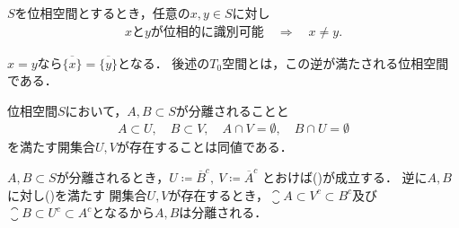 	\begin{screen}
		\begin{thm}[位相的に識別可能な二点は相異なる]
			$S$を位相空間とするとき，任意の$x,y \in S$に対し
			\begin{align}
				\mbox{$x$と$y$が位相的に識別可能} \quad \Longrightarrow \quad
				x \neq y .
			\end{align}
		\end{thm}
	\end{screen}
	
	\begin{prf}
		$x = y$なら$\overline{\{x\}} = \overline{\{y\}}$となる．
		後述の$T_0$空間とは，この逆が満たされる位相空間である．
		\QED
	\end{prf}
	
	\begin{screen}
		\begin{thm}[分離される集合は他方を含まない近傍を持つ]
		\label{thm:the_equivalent_condition_of_separatedness}
			位相空間$S$において，$A,B \subset S$が分離されることと
			\begin{align}
				A \subset U,\quad B \subset V,\quad 
				A \cap V = \emptyset,
				\quad B \cap U = \emptyset
				\label{eq:thm_the_equivalent_condition_of_separatedness}
			\end{align}
			を満たす開集合$U,V$が存在することは同値である．
		\end{thm}
	\end{screen}
	
	\begin{prf}
		$A,B \subset S$が分離されるとき，$U \coloneqq \overline{B}^c,\ V \coloneqq \overline{A}^c$
		とおけば()が成立する．
		逆に$A,B$に対し()を満たす
		開集合$U,V$が存在するとき，$\closure{A} \subset V^c \subset B^c$及び
		$\closure{B} \subset U^c \subset A^c$となるから$A,B$は分離される．
		\QED
	\end{prf}
	
